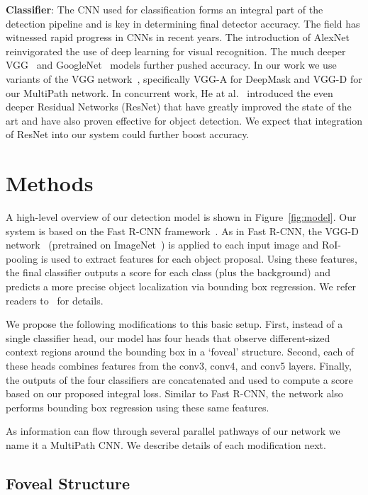 \documentclass{bmvc2k}
\newcommand{\fig}[1]{Figure~\ref{fig:#1}}
\begin{document}
\textbf{Classifier}: The CNN used for classification forms an integral part of the detection pipeline and is key in determining final detector accuracy. The field has witnessed rapid progress in CNNs in recent years. The introduction of AlexNet~\cite{AlexNet} reinvigorated the use of deep learning for visual recognition. The much deeper VGG~\cite{Simonyan15} and GoogleNet~\cite{GoogLeNet} models further pushed accuracy. In our work we use variants of the VGG network~\cite{Simonyan15}, specifically VGG-A for DeepMask and VGG-D for our MultiPath network. In concurrent work, He at al.~\cite{he2015deep} introduced the even deeper Residual Networks (ResNet) that have greatly improved the state of the art and have also proven effective for object detection. We expect that integration of ResNet into our system could further boost accuracy.

\section{Methods}

A high-level overview of our detection model is shown in \fig{model}. Our system is based on the Fast R-CNN framework~\cite{girshick15fastrcnn}. As in Fast R-CNN, the VGG-D network~\cite{Simonyan15} (pretrained on ImageNet~\cite{imagenet_cvpr09}) is applied to each input image and RoI-pooling is used to extract features for each object proposal. Using these features, the final classifier outputs a score for each class (plus the background) and predicts a more precise object localization via bounding box regression. We refer readers to~\cite{girshick15fastrcnn} for details.

We propose the following modifications to this basic setup. First, instead of a single classifier head, our model has four heads that observe different-sized context regions around the bounding box in a `foveal' structure. Second, each of these heads combines features from the conv3, conv4, and conv5 layers. Finally, the outputs of the four classifiers are concatenated and used to compute a score based on our proposed integral loss. Similar to Fast R-CNN, the network also performs bounding box regression using these same features.

As information can flow through several parallel pathways of our network we name it a MultiPath CNN. We describe details of each modification next.

\subsection{Foveal Structure}
\end{document}
